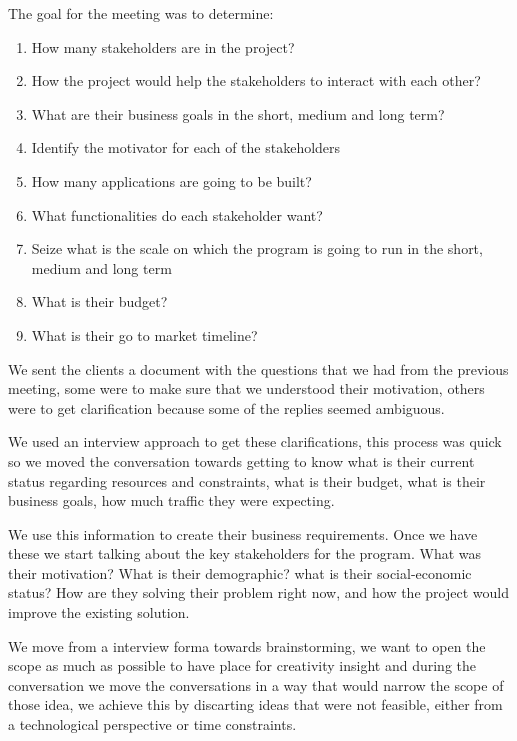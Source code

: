 The goal for the meeting was to determine:
\begin{enumerate}
    \item How many stakeholders are in the project?
    \item How the project would help the stakeholders to interact with each other?
    \item What are their business goals in the short, medium and long term?
    \item Identify the motivator for each of the stakeholders
    \item How many applications are going to be built?
    \item What functionalities do each stakeholder want? 
    \item Seize what is the scale on which the program is going to run in the short, medium and long term
    \item What is their budget?
    \item What is their go to market timeline?
\end{enumerate}

\noindent We sent the clients a document with the questions that we had from 
the previous meeting, some were to make sure that we understood their 
motivation, others were to get clarification because some of the replies 
seemed ambiguous.\linebreak

\noindent We used an interview approach to get these clarifications, this 
process was quick so we moved the conversation towards getting to know what is 
their current status regarding resources and constraints, what is their budget, 
what is their business goals, how much traffic they were expecting.\linebreak

\noindent We use this information to create their business requirements. Once 
we have these we start talking about the key stakeholders for the program. What 
was their motivation? What is their demographic? what is their social-economic 
status? How are they solving their problem right now, and how the project 
would improve the existing solution.\linebreak

\noindent We move from a interview forma towards brainstorming, we want to open 
the scope as much as possible to have place for creativity insight and during 
the conversation we move the conversations in a way that would narrow the scope 
of those idea, we achieve this by discarting ideas that were not feasible, 
either from a technological perspective or time constraints.

